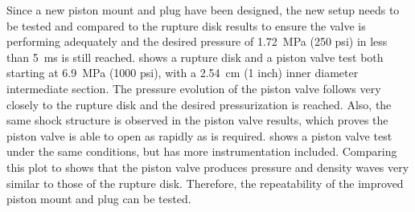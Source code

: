Since a new piston mount and plug have been designed, the new setup needs to be tested and compared to the rupture disk results to ensure the valve is performing adequately and the desired pressure of \SI{1.72}{\mega\pascal} (250 psi) in less than \SI{5}{\milli\second} is still reached.  shows a rupture disk and a piston valve test both starting at \SI{6.9}{\mega\pascal} (1000 psi), with a \SI{2.54}{\centi\meter} (1 inch) inner diameter intermediate section. The pressure evolution of the piston valve follows very closely to the rupture disk and the desired pressurization is reached. Also, the same shock structure is observed in the piston valve results, which proves the piston valve is able to open as rapidly as is required.  shows a piston valve test under the same conditions, but has more instrumentation included. Comparing this plot to  shows that the piston valve produces pressure and density waves very similar to those of the rupture disk. Therefore, the repeatability of the improved piston mount and plug can be tested. 





